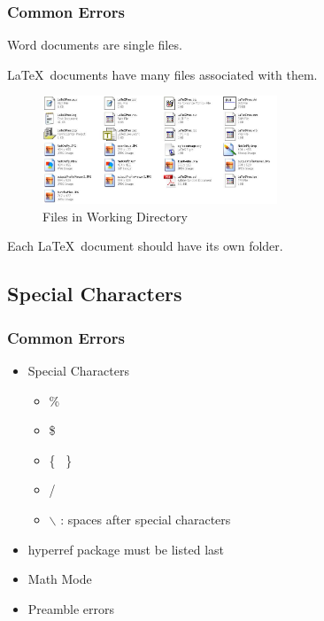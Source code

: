 \documentclass{beamer}
\begin{document}
\begin{frame}
\frametitle{Common Errors}
Word documents are single files.

\LaTeX \ documents have many files associated with them.

\begin{figure}[htbp]
\centering
\includegraphics[width=7cm]{bunchaFiles.jpg}
\caption{Files in Working Directory}
\label{fig::bunchaFiles}
\end{figure}
Each \LaTeX \ document should have its own folder.

\end{frame}

\subsection{Special Characters}

\begin{frame}[fragile]
\frametitle{Common Errors}

\begin{itemize}

\item Special Characters
\begin{itemize}
\item \%
\item \$
\item \{ \ \}
\item /
\item $\backslash$ : spaces after special characters
\end{itemize}

\item hyperref package must be listed last
\item Math Mode
\item Preamble errors

\end{itemize}

\end{frame}
\end{document}

